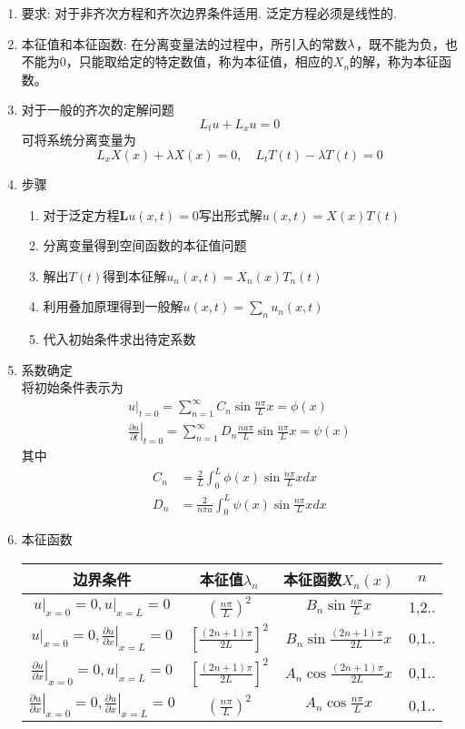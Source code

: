 \documentclass[UTF8,9pt]{ctexart}
\begin{document}
\begin{enumerate}
\item 要求: 对于非齐次方程和齐次边界条件适用. 泛定方程必须是线性的. 
\item 本征值和本征函数: 在分离变量法的过程中，所引入的常数$\lambda$，既不能为负，也不能为0，只能取给定的特定数值，称为本征值，相应的$X_n$的解，称为本征函数。
\item 对于一般的齐次的定解问题
$$ 
L_{t} u+L_{x} u=0
$$可将系统分离变量为
$$ 
L_{x} X(x)+\lambda X(x)=0
,\quad
L_{t} T(t)-\lambda T(t)=0
$$
\item 步骤
\begin{enumerate}
\item 对于泛定方程$\mathbf{L} u(x, t)=0$写出形式解$u(x, t)=X(x) T(t)$
\item 分离变量得到空间函数的本征值问题
\item 解出$T(t)$得到本征解$u_{n}(x, t)=X_{n}(x) T_{n}(t)$
\item 利用叠加原理得到一般解$u(x, t)=\sum_{n} u_{n}(x, t)$
\item 代入初始条件求出待定系数
\end{enumerate}
\item 系数确定\\
将初始条件表示为$$ 
\begin{array}{l}{u|_{t=0}=\sum_{n=1}^{\infty} C_{n} \sin \frac{n \pi}{L} x=\phi(x)} \\ {\left.\frac{\partial u}{\partial t}\right|_{t=0}=\sum_{n=1}^{\infty} D_{n} \frac{n a \pi}{L} \sin \frac{n \pi}{L} x=\psi(x)}\end{array}
$$其中$$ 
\begin{aligned} C_{n} &=\frac{2}{L} \int_{0}^{L} \phi(x) \sin \frac{n \pi}{L} x d x \\ D_{n} &=\frac{2}{n \pi a} \int_{0}^{L} \psi(x) \sin \frac{n \pi}{L} x d x \end{aligned}
$$
\item 本征函数\\
\begin{tabular}{|c|c|c|c|}
\hline
边界条件                 & 本征值$\lambda_{n}$               & 本征函数$X_{n}(x)$                                        & $n$ \\ \hline
$\left.u\right|_{x=0}=0,\left.u\right|_{x=L}=0$                                                         & $\left(\frac{n \pi}{L}\right)^{2}$         & $B_{n} \sin \frac{n \pi}{L} x$         & 1,2..  \\ \hline
$\left.u\right|_{x=0}=0,\left.\frac{\partial u}{\partial x}\right|_{x=L}=0$                             & $\left[\frac{(2 n+1) \pi}{2 L}\right]^{2}$ & $B_{n} \sin \frac{(2 n+1) \pi}{2 L} x$ & 0,1..  \\ \hline
$\left.\frac{\partial u}{\partial x}\right|_{x=0}=0,\left.u\right|_{x=L}=0$                             & $\left[\frac{(2 n+1) \pi}{2 L}\right]^{2}$ & $A_{n} \cos \frac{(2 n+1) \pi}{2 L} x$ & 0,1..  \\ \hline
$\left.\frac{\partial u}{\partial x}\right|_{x=0}=0,\left.\frac{\partial u}{\partial x}\right|_{x=L}=0$ & $\left(\frac{n \pi}{L}\right)^{2}$         & $A_{n} \cos \frac{n \pi}{L} x$         & 0,1..  \\ \hline
\end{tabular}
\end{enumerate}
\end{document}
